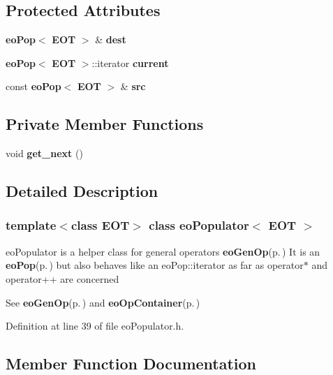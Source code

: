 \subsection*{Protected Attributes}
\begin{CompactItemize}
\item 
{\bf eo\-Pop}$<$ {\bf EOT} $>$ \& {\bf dest}\label{classeo_populator_p0}

\item 
{\bf eo\-Pop}$<$ {\bf EOT} $>$::iterator {\bf current}\label{classeo_populator_p1}

\item 
const {\bf eo\-Pop}$<$ {\bf EOT} $>$ \& {\bf src}\label{classeo_populator_p2}

\end{CompactItemize}
\subsection*{Private Member Functions}
\begin{CompactItemize}
\item 
void {\bf get\_\-next} ()\label{classeo_populator_d0}

\end{CompactItemize}


\subsection{Detailed Description}
\subsubsection*{template$<$class EOT$>$ class eo\-Populator$<$ EOT $>$}

eo\-Populator is a helper class for general operators {\bf eo\-Gen\-Op}{\rm (p.\,\pageref{classeo_gen_op})} It is an {\bf eo\-Pop}{\rm (p.\,\pageref{classeo_pop})} but also behaves like an eo\-Pop::iterator as far as operator$\ast$ and operator++ are concerned 

See {\bf eo\-Gen\-Op}{\rm (p.\,\pageref{classeo_gen_op})} and {\bf eo\-Op\-Container}{\rm (p.\,\pageref{classeo_op_container})} 



Definition at line 39 of file eo\-Populator.h.

\subsection{Member Function Documentation}
